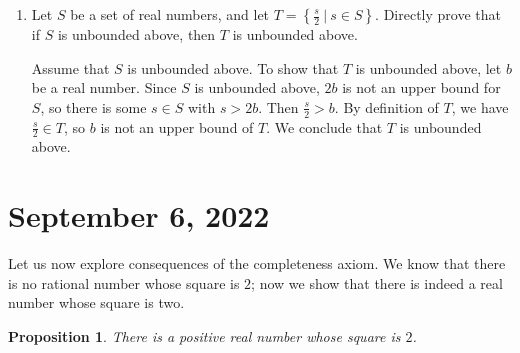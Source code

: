 \documentclass[12pt]{amsart}
\numberwithin{equation}{section}
\theoremstyle{plain} %
\newtheorem{prop}[equation]{Proposition}
\newcommand{\Sept}[1]{\section{September #1, 2022}}
\theoremstyle{definition}
\theoremstyle{remark}
\begin{document}
\begin{enumerate}
\item Let $S$ be a set of real numbers, and let $\displaystyle T=\left\{ \frac{s}{2} \ | \ s\in S\right\}$. Directly prove that if $S$ is unbounded above, then $T$ is unbounded above.
\begin{framed}
Assume that $S$ is unbounded above. To show that $T$ is unbounded above, let $b$ be a real number. Since $S$ is unbounded above, $2b$ is not an upper bound for $S$, so there is some $s\in S$ with $s>2b$. Then $\frac{s}{2} > b$. By definition of $T$, we have $\frac{s}{2}\in T$, so $b$ is not an upper bound of $T$. We conclude that $T$ is unbounded above.
\end{framed}
\end{enumerate}



\Sept{6}



Let us now explore consequences of the completeness axiom. We know that there is no rational number whose square is $2$; now we show that there is indeed a real number whose square is two.


\begin{prop} \label{prop116} There is a positive real number whose square is $2$.
\end{prop}
\end{document}
